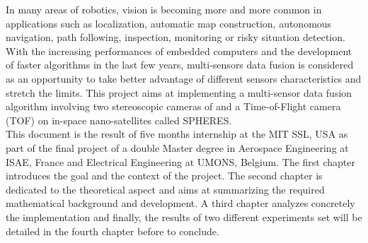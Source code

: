\cleardoublepage
\setcounter{savepage}{\thepage}
\begin{abstractpage}
In many areas of robotics, vision is becoming more and more common in applications such as localization, automatic map construction, autonomous navigation, path following, inspection, monitoring or risky situation detection. With the increasing performances of embedded computers and the development of faster algorithms in the last few years, multi-sensors data fusion is considered as an opportunity to take better advantage of different sensors characteristics and stretch the limits. This project aims at implementing a multi-sensor data fusion algorithm involving two stereoscopic cameras of and a Time-of-Flight camera (TOF) on in-space nano-satellites called SPHERES.\\
This document is the result of five months internship at the MIT SSL, USA as part of the final project of a double Master degree in Aerospace Engineering at ISAE, France and Electrical Engineering at UMONS, Belgium. The first chapter introduces the goal and the context of the project. The second chapter is dedicated to the theoretical aspect and aims at summarizing the required mathematical background and development. A third chapter analyzes concretely the implementation and finally, the results of two different experiments set will be detailed in the fourth chapter before to conclude.
\end{abstractpage}

% 

\cleardoublepage

